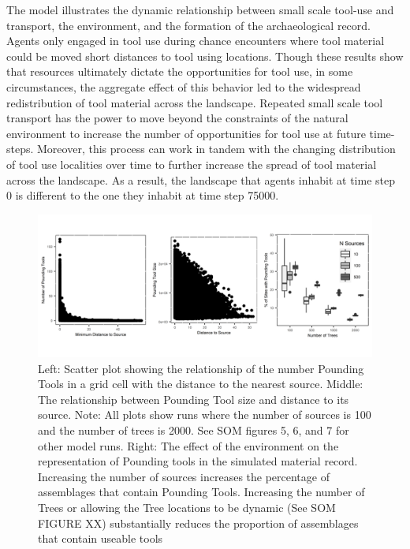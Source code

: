 \documentclass[9pt,twocolumn,twoside,]{pnas-new}
\begin{document}
The model illustrates the dynamic relationship between small scale
tool-use and transport, the environment, and the formation of the
archaeological record. Agents only engaged in tool use during chance
encounters where tool material could be moved short distances to tool
using locations. Though these results show that resources ultimately
dictate the opportunities for tool use, in some circumstances, the
aggregate effect of this behavior led to the widespread redistribution
of tool material across the landscape. Repeated small scale tool
transport has the power to move beyond the constraints of the natural
environment to increase the number of opportunities for tool use at
future time-steps. Moreover, this process can work in tandem with the
changing distribution of tool use localities over time to further
increase the spread of tool material across the landscape. As a result,
the landscape that agents inhabit at time step 0 is different to the one
they inhabit at time step 75000.

\begin{figure}
\includegraphics[width=6.5in]{Reeves_et_al_2021_Panda_ABM_files/figure-latex/figure 4-1.png}
\caption{Left: Scatter plot showing the relationship of the number Pounding Tools in a grid cell with the distance to the nearest source. Middle: The relationship between Pounding Tool size and distance to its source. Note: All plots show runs where the number of sources is 100 and the number of trees is 2000. See SOM figures 5, 6, and 7 for other model runs. Right: The effect of the environment on the representation of Pounding tools in the simulated material record. Increasing the number of sources increases the percentage of assemblages that contain Pounding Tools. Increasing the number of Trees or allowing the Tree locations to be dynamic (See SOM FIGURE XX) substantially reduces the proportion of assemblages that contain useable tools}
\label{assemblages}
\end{figure}
\end{document}
